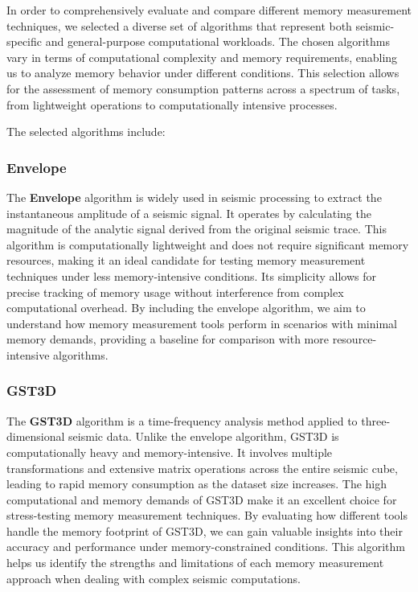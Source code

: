 In order to comprehensively evaluate and compare different memory measurement techniques, we selected a diverse set of algorithms that represent both seismic-specific and general-purpose computational workloads.
The chosen algorithms vary in terms of computational complexity and memory requirements, enabling us to analyze memory behavior under different conditions.
This selection allows for the assessment of memory consumption patterns across a spectrum of tasks, from lightweight operations to computationally intensive processes.

The selected algorithms include:

\subsubsection{Envelope}

The \textbf{Envelope} algorithm is widely used in seismic processing to extract the instantaneous amplitude of a seismic signal.
It operates by calculating the magnitude of the analytic signal derived from the original seismic trace.
This algorithm is computationally lightweight and does not require significant memory resources, making it an ideal candidate for testing memory measurement techniques under less memory-intensive conditions.
Its simplicity allows for precise tracking of memory usage without interference from complex computational overhead.
By including the envelope algorithm, we aim to understand how memory measurement tools perform in scenarios with minimal memory demands, providing a baseline for comparison with more resource-intensive algorithms.


\subsubsection{\ac{GST3D}}

The \textbf{\ac{GST3D}} algorithm is a time-frequency analysis method applied to three-dimensional seismic data.
Unlike the envelope algorithm, \ac{GST3D} is computationally heavy and memory-intensive.
It involves multiple transformations and extensive matrix operations across the entire seismic cube, leading to rapid memory consumption as the dataset size increases.
The high computational and memory demands of \ac{GST3D} make it an excellent choice for stress-testing memory measurement techniques.
By evaluating how different tools handle the memory footprint of \ac{GST3D}, we can gain valuable insights into their accuracy and performance under memory-constrained conditions.
This algorithm helps us identify the strengths and limitations of each memory measurement approach when dealing with complex seismic computations.

